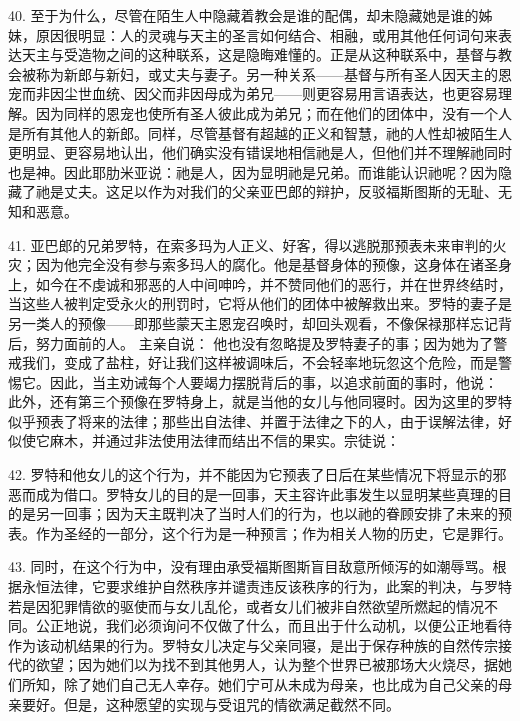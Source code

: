 40. 至于为什么，尽管在陌生人中隐藏着教会是谁的配偶，却未隐藏她是谁的姊妹，原因很明显：人的灵魂与天主的圣言如何结合、相融，或用其他任何词句来表达天主与受造物之间的这种联系，这是隐晦难懂的。正是从这种联系中，基督与教会被称为新郎与新妇，或丈夫与妻子。另一种关系——基督与所有圣人因天主的恩宠而非因尘世血统、因父而非因母成为弟兄——则更容易用言语表达，也更容易理解。因为同样的恩宠也使所有圣人彼此成为弟兄；而在他们的团体中，没有一个人是所有其他人的新郎。同样，尽管基督有超越的正义和智慧，祂的人性却被陌生人更明显、更容易地认出，他们确实没有错误地相信祂是人，但他们并不理解祂同时也是神。因此耶肋米亚说：祂是人，因为显明祂是兄弟。而谁能认识祂呢？因为隐藏了祂是丈夫。这足以作为对我们的父亲亚巴郎的辩护，反驳福斯图斯的无耻、无知和恶意。\par

41. 亚巴郎的兄弟罗特，在索多玛为人正义、好客，得以逃脱那预表未来审判的火灾；因为他完全没有参与索多玛人的腐化。他是基督身体的预像，这身体在诸圣身上，如今在不虔诚和邪恶的人中间呻吟，并不赞同他们的恶行，并在世界终结时，当这些人被判定受永火的刑罚时，它将从他们的团体中被解救出来。罗特的妻子是另一类人的预像——即那些蒙天主恩宠召唤时，却回头观看，不像保禄那样忘记背后，努力面前的人。 主亲自说：  他也没有忽略提及罗特妻子的事；因为她为了警戒我们，变成了盐柱，好让我们这样被调味后，不会轻率地玩忽这个危险，而是警惕它。因此，当主劝诫每个人要竭力摆脱背后的事，以追求前面的事时，他说：  此外，还有第三个预像在罗特身上，就是当他的女儿与他同寝时。因为这里的罗特似乎预表了将来的法律；那些出自法律、并置于法律之下的人，由于误解法律，好似使它麻木，并通过非法使用法律而结出不信的果实。宗徒说： \par

42. 罗特和他女儿的这个行为，并不能因为它预表了日后在某些情况下将显示的邪恶而成为借口。罗特女儿的目的是一回事，天主容许此事发生以显明某些真理的目的是另一回事；因为天主既判决了当时人们的行为，也以祂的眷顾安排了未来的预表。作为圣经的一部分，这个行为是一种预言；作为相关人物的历史，它是罪行。\par

43. 同时，在这个行为中，没有理由承受福斯图斯盲目敌意所倾泻的如潮辱骂。根据永恒法律，它要求维护自然秩序并谴责违反该秩序的行为，此案的判决，与罗特若是因犯罪情欲的驱使而与女儿乱伦，或者女儿们被非自然欲望所燃起的情况不同。公正地说，我们必须询问不仅做了什么，而且出于什么动机，以便公正地看待作为该动机结果的行为。罗特女儿决定与父亲同寝，是出于保存种族的自然传宗接代的欲望；因为她们以为找不到其他男人，认为整个世界已被那场大火烧尽，据她们所知，除了她们自己无人幸存。她们宁可从未成为母亲，也比成为自己父亲的母亲要好。但是，这种愿望的实现与受诅咒的情欲满足截然不同。\par

